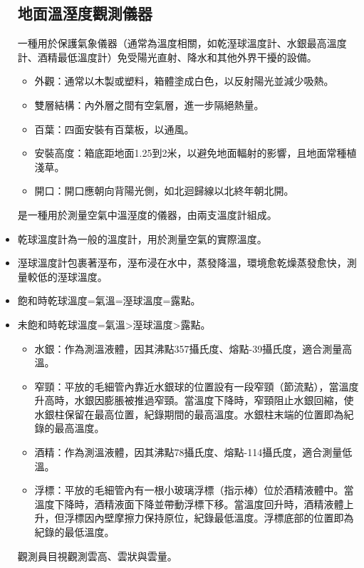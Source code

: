 \documentclass[a4paper,12pt]{report}
\begin{document}
\begin{itemize}
\subsection{地面溫溼度觀測儀器}
一種用於保護氣象儀器（通常為溫度相關，如乾溼球溫度計、水銀最高溫度計、酒精最低溫度計）免受陽光直射、降水和其他外界干擾的設備。
\begin{itemize}
\item 外觀：通常以木製或塑料，箱體塗成白色，以反射陽光並減少吸熱。
\item 雙層結構：內外層之間有空氣層，進一步隔絕熱量。
\item 百葉：四面安裝有百葉板，以通風。
\item 安裝高度：箱底距地面1.25到2米，以避免地面輻射的影響，且地面常種植淺草。
\item 開口：開口應朝向背陽光側，如北迴歸線以北終年朝北開。
\end{itemize}
是一種用於測量空氣中溫溼度的儀器，由兩支溫度計組成。
\bit
\item 乾球溫度計為一般的溫度計，用於測量空氣的實際溫度。
\item 溼球溫度計包裹著溼布，溼布浸在水中，蒸發降溫，環境愈乾燥蒸發愈快，測量較低的溼球溫度。
\item 飽和時乾球溫度=氣溫=溼球溫度=露點。
\item 未飽和時乾球溫度=氣溫>溼球溫度>露點。
\eit
{}
\begin{itemize}
\item 水銀：作為測溫液體，因其沸點357攝氏度、熔點-39攝氏度，適合測量高溫。
\item 窄頸：平放的毛細管內靠近水銀球的位置設有一段窄頸（節流點），當溫度升高時，水銀因膨脹被推過窄頸。當溫度下降時，窄頸阻止水銀回縮，使水銀柱保留在最高位置，紀錄期間的最高溫度。水銀柱末端的位置即為紀錄的最高溫度。
\end{itemize}
\begin{itemize}
\item 酒精：作為測溫液體，因其沸點78攝氏度、熔點-114攝氏度，適合測量低溫。
\item 浮標：平放的毛細管內有一根小玻璃浮標（指示棒）位於酒精液體中。當溫度下降時，酒精液面下降並帶動浮標下移。當溫度回升時，酒精液體上升，但浮標因內壁摩擦力保持原位，紀錄最低溫度。浮標底部的位置即為紀錄的最低溫度。
\end{itemize}
觀測員目視觀測雲高、雲狀與雲量。

\end{itemize}
\end{document}
